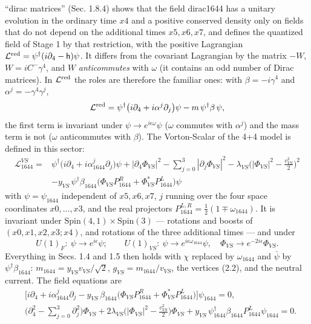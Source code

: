 \documentclass[
  10pt,
]{article}
\begin{document}
``dirac matrices'' (Sec. 1.8.4) shows that the field dirac1644 has a
unitary evolution in the ordinary time \(x4\) and a positive conserved
density only on fields that do not depend on the additional times
\(x5,x6,x7\), and defines the quantized field of Stage 1 by that
restriction, with the positive Lagrangian
\(\mathcal L^{\rm red}=\psi^\dagger(i\partial_4-\mathsf h)\psi\). It
differs from the covariant Lagrangian by the matrix \(-W\),
\(W=iC^{-}\gamma^4\), and \(W\) \emph{anticommutes} with \(\omega\) (it
contains an odd number of Dirac matrices). In \(\mathcal L^{\rm red}\)
the roles are therefore the familiar ones: with \(\beta=-i\gamma^4\) and
\(\alpha^j=-\gamma^4\gamma^j\),
\[\mathcal L^{\rm red}=\psi^\dagger\big(i\partial_4+i\alpha^j\partial_j\big)\psi-m\,\psi^\dagger\beta\,\psi,\]
the first term is invariant under \(\psi\to e^{i\epsilon\omega}\psi\)
(\(\omega\) commutes with \(\alpha^j\)) and the mass term is not
(\(\omega\) anticommutes with \(\beta\)). The Vorton-Scalar of the 4+4
model is defined in this sector:
\[\boxed{\;\begin{aligned}\mathcal L_{1644}^{VS}={}&\psi^\dagger\big(i\partial_4+i\alpha_{1644}^j\partial_j\big)\psi
+|\partial_4\Phi_{VS}|^2-\sum_{j=0}^{3}|\partial_j\Phi_{VS}|^2-\lambda_{VS}\Big(|\Phi_{VS}|^2-\frac{v_{VS}^2}{2}\Big)^2\\
&-y_{VS}\,\psi^\dagger\beta_{1644}\big(\Phi_{VS}P_{1644}^{R}+\Phi_{VS}^{*}P_{1644}^{L}\big)\psi\end{aligned}\;}\tag{3.1}\]
with \(\psi=\psi_{1644}\) independent of \(x5,x6,x7\), \(j\) running
over the four space coordinates \(x0,\dots,x3\), and the real projectors
\(P_{1644}^{L,R}=\tfrac12(1\mp\omega_{1644})\). It is invariant under
\(\mathrm{Spin}(4,1)\times\mathrm{Spin}(3)\) --- rotations and boosts of
\((x0,x1,x2,x3;x4)\), and rotations of the three additional times ---
and under
\[U(1)_F:\ \psi\to e^{i\epsilon}\psi;\qquad U(1)_{VS}:\ \psi\to e^{i\epsilon\omega_{1644}}\psi,\quad\Phi_{VS}\to e^{-2i\epsilon}\Phi_{VS}.\]
Everything in Secs. 1.4 and 1.5 then holds with \(\chi\) replaced by
\(\omega_{1644}\) and \(\bar\psi\) by \(\psi^\dagger\beta_{1644}\):
\(m_{1644}=y_{VS}v_{VS}/\sqrt2\), \(g_{VS}=m_{1644}/v_{VS}\), the
vertices (2.2), and the neutral current. The field equations are
\[\boxed{\;\begin{aligned}
&\big[i\partial_4+i\alpha_{1644}^j\partial_j-y_{VS}\,\beta_{1644}\big(\Phi_{VS}P_{1644}^{R}+\Phi_{VS}^{*}P_{1644}^{L}\big)\big]\psi_{1644}=0,\\
&\big(\partial_4^2-\textstyle\sum_{j=0}^{3}\partial_j^2\big)\Phi_{VS}+2\lambda_{VS}\Big(|\Phi_{VS}|^2-\frac{v_{VS}^2}{2}\Big)\Phi_{VS}+y_{VS}\,\psi_{1644}^\dagger\beta_{1644}P_{1644}^{L}\psi_{1644}=0 .
\end{aligned}\;}\tag{3.2}\]
\end{document}
